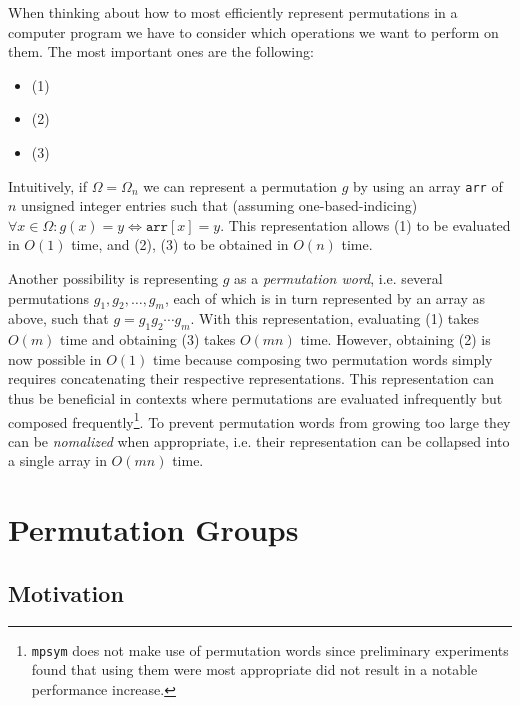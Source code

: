 When thinking about how to most efficiently represent permutations in a computer
program we have to consider which operations we want to perform on them. The
most important ones are the following:

\begin{itemize}
  \item {} (1)
  \item {} (2)
  \item {} (3)
\end{itemize}

\noindent
Intuitively, if $\Omega = \Omega_n$ we can represent a permutation
$g$ by using an array \texttt{arr} of $n$ unsigned integer entries such that
(assuming one-based-indicing) $\forall x \in \Omega: g(x) = y \Leftrightarrow
\texttt{arr}[x] = y$. This representation allows (1) to be evaluated in
$O(1)$ time, and (2), (3) to be obtained in $O(n)$ time.

Another possibility is representing $g$ as a \textit{permutation word}, i.e.
several permutations $g_1, g_2, \dots, g_m$, each of which is in turn
represented by an array as above, such that $g = g_1 g_2 \cdots g_m$.  With
this representation, evaluating (1) takes $O(m)$ time and obtaining (3) takes
$O(m n)$ time. However, obtaining (2) is now possible in $O(1)$ time because
composing two permutation words simply requires concatenating their respective
representations. This representation can thus be beneficial in contexts where
permutations are evaluated infrequently but composed
frequently\footnote{\texttt{mpsym} does not make use of permutation words since
preliminary experiments found that using them were most appropriate did not
result in a notable performance increase.}. To prevent permutation words from
growing too large they can be \textit{nomalized} when appropriate, i.e. their
representation can be collapsed into a single array in $O(mn)$ time.

\section{Permutation Groups}
\label{sec:theo_permutation_groups}

\subsection{Motivation}
\label{subsec:pg_motivation}

